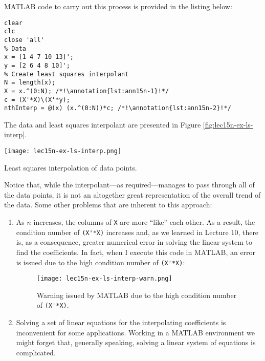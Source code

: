 \noindent MATLAB code to carry out this process is provided in the listing below:
\begin{lstlisting}[style=myMatlab]
clear
clc
close 'all'
% Data
x = [1 4 7 10 13]';
y = [2 6 4 8 10]';
% Create least squares interpolant
N = length(x);
X = x.^(0:N); /*!\annotation{lst:ann15n-1}!*/
c = (X'*X)\(X'*y);
nthInterp = @(x) (x.^(0:N))*c; /*!\annotation{lst:ann15n-2}!*/
\end{lstlisting}

\noindent The data and least squares interpolant are presented in Figure \ref{fig:lec15n-ex-ls-interp}.  
\begin{marginfigure}
\texttt{[image: lec15n-ex-ls-interp.png]}
\caption{Least squares interpolation of data points.}
\label{fig:lec15n-ex-ls-interp}
\end{marginfigure}
Notice that, while the interpolant---as required---manages to pass through all of the data points, it is not an altogether great representation of the overall trend of the data. Some other problems that are inherent to this approach:
\begin{enumerate}
\item As $n$ increases, the columns of \lstinline[style=myMatlab]{X} are more ``like'' each other.  As a result, the condition number of \lstinline[style=myMatlab]{(X'*X)} increases and, as we learned in Lecture 10, there is, as a consequence, greater numerical error in solving the linear system to find the coefficients.  In fact, when I execute this code in MATLAB, an error is issued due to the high condition number of \lstinline[style=myMatlab]{(X'*X)}:

\begin{figure}
\texttt{[image: lec15n-ex-ls-interp-warn.png]}
\caption{Warning issued by MATLAB due to the high condition number of \lstinline[style=myMatlab]{(X'*X)}.}
\label{fig:lec15n-ex-ls-interp-warn}
\end{figure}

\item Solving a set of linear equations for the interpolating coefficients is inconvenient for some applications.  Working in a MATLAB environment we might forget that, generally speaking, solving a linear system of equations is complicated. 
\end{enumerate}

